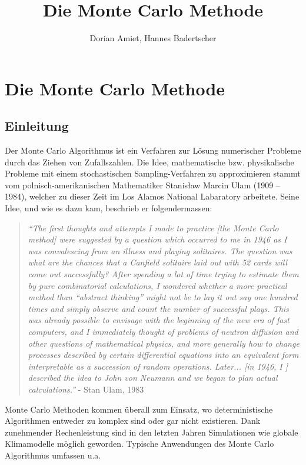 \documentclass{book}
\begin{document}
\title{Die Monte Carlo Methode}
\author{Dorian Amiet, Hannes Badertscher}
\date{}
\maketitle



\chapter{Die Monte Carlo Methode}
\begin{refsection}

\section{Einleitung}
Der Monte Carlo Algorithmus ist ein Verfahren zur Lösung numerischer Probleme durch das Ziehen von Zufallszahlen. Die Idee, mathematische bzw. physikalische Probleme mit einem stochastischen Sampling-Verfahren zu approximieren stammt vom polnisch-amerikanischen Mathematiker Stanisław Marcin Ulam (1909 -- 1984), welcher zu dieser Zeit im Los Alamos National Labaratory arbeitete. Seine Idee, und wie es dazu kam, beschrieb er folgendermassen: \\

\begin{quote}
\textit{“The first thoughts and attempts I made to practice [the Monte Carlo method] were suggested by a question which occurred to me in 1946 as I was convalescing from an illness and playing solitaires. The question was what are the chances that a Canfield solitaire laid out with 52 cards will come out successfully? After spending a lot of time trying to estimate them by pure combinatorial calculations, I wondered whether a more practical method than “abstract thinking” might not be to lay it out say one hundred times and simply observe and count the number of successful plays. This was already possible to envisage with the beginning of the new era of fast computers, and I immediately thought of problems of neutron diffusion and other questions of mathematical physics, and more generally how to change processes described by certain differential equations into an equivalent form interpretable as a succession of random operations. Later... [in 1946, I ] described the idea to John von Neumann and we began to plan actual calculations.”} - Stan Ulam, 1983
\end{quote}

Monte Carlo Methoden kommen überall zum Einsatz, wo deterministische Algorithmen entweder zu komplex sind oder gar nicht existieren. Dank zunehmender Rechenleistung sind in den letzten Jahren Simulationen wie globale Klimamodelle möglich geworden. Typische Anwendungen des Monte Carlo Algorithmus umfassen u.a.


\end{refsection}
\end{document}
